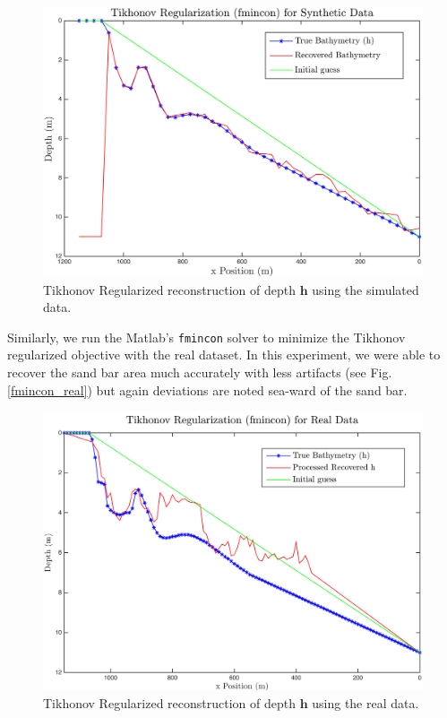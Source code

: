 \begin{figure}[H]
\center
\includegraphics[scale=0.47]{img/fmincon_simulated_25_new.png} %
\caption{Tikhonov Regularized reconstruction of depth $\mathbf{h}$ using the simulated data.}
\label{fmincon_simulated}
\end{figure}

Similarly, we run the Matlab's \verb|fmincon| solver to minimize the Tikhonov regularized objective with the real dataset. In this experiment, we were able to recover the sand bar area much accurately with less artifacts (see Fig. \ref{fmincon_real}) but again deviations are noted sea-ward of the sand bar.

\begin{figure}[H]
\center
\includegraphics[scale=0.46]{img/fmincon_real_data_oct09.png} %
\caption{Tikhonov Regularized reconstruction of depth $\mathbf{h}$ using the real data.}
\label{fmincon_simulatedreal}
\end{figure}




